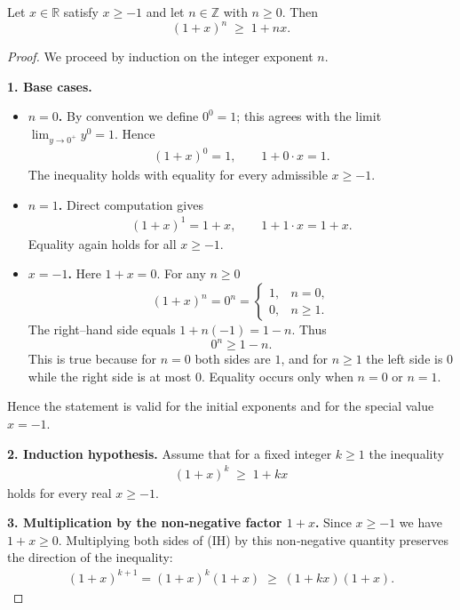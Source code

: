 \begin{theorem}
Let \(x\in\mathbb{R}\) satisfy \(x\ge -1\) and let \(n\in\mathbb{Z}\) with \(n\ge 0\). Then  
\[
(1+x)^{n}\;\ge\;1+nx .
\]
\end{theorem}

\begin{proof}
We proceed by induction on the integer exponent \(n\).

\medskip\noindent\textbf{1. Base cases.}
\begin{itemize}
\item \textbf{\(n=0\).}  By convention we define \(0^{0}=1\); this agrees with the limit
\(\displaystyle \lim_{y\to0^{+}}y^{0}=1\). Hence
\begin{align*}
(1+x)^{0}=1,\qquad 1+0\cdot x = 1 .
\end{align*}
The inequality holds with equality for every admissible \(x\ge -1\).

\item \textbf{\(n=1\).}  Direct computation gives
\begin{align*}
(1+x)^{1}=1+x,\qquad 1+1\cdot x = 1+x .
\end{align*}
Equality again holds for all \(x\ge -1\).

\item \textbf{\(x=-1\).}  Here \(1+x=0\). For any \(n\ge 0\)
\[
(1+x)^{n}=0^{n}=%
\begin{cases}
1, & n=0,\\[2pt]
0, & n\ge 1 .
\end{cases}
\]
The right–hand side equals \(1+n(-1)=1-n\). Thus
\[
0^{n}\ge 1-n .
\]
This is true because for \(n=0\) both sides are \(1\), and for \(n\ge 1\) the left side is \(0\) while the right side is at most \(0\). Equality occurs only when \(n=0\) or \(n=1\).
\end{itemize}
Hence the statement is valid for the initial exponents and for the special value \(x=-1\).

\medskip\noindent\textbf{2. Induction hypothesis.}
Assume that for a fixed integer \(k\ge 1\) the inequality
\begin{align}
(1+x)^{k}\;\ge\;1+kx \tag{IH}
\end{align}
holds for every real \(x\ge -1\).

\medskip\noindent\textbf{3. Multiplication by the non‑negative factor \(1+x\).}
Since \(x\ge -1\) we have \(1+x\ge 0\). Multiplying both sides of (IH) by this
non‑negative quantity preserves the direction of the inequality:
\begin{align}
(1+x)^{k+1}= (1+x)^{k}(1+x)\;\ge\;(1+kx)(1+x). \tag{1}
\end{align}


\end{proof}
